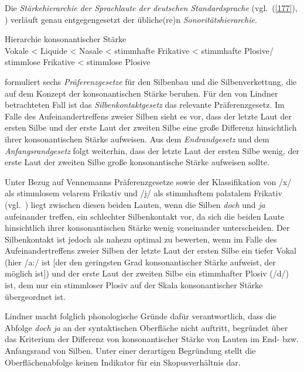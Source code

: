 Die \textit{Stärkehierarchie der Sprachlaute der deutschen Standardsprache} (vgl.\ (\ref{177}), \citealt[284]{Vennemann1982}) verläuft genau entgegengesetzt der übliche(re)n  \textit{Sonori\-tätshierarchie}.

\begin{exe}
	\ex\label{177} 
	Hierarchie konsonantischer Stärke \\
	Vokale < Liquide < Nasale < stimmhafte Frikative < stimmhafte Plosive/ \\ stimmlose Frikative < stimmlose Plosive
\end{exe}
\citet[283]{Vennemann1982} formuliert sechs \textit{Präferenzgesetze} für den Silbenbau und die Silbenverkettung, die auf dem Konzept der konsonantischen Stärke beruhen. Für den von Lindner betrachteten Fall ist das \textit{Silbenkontaktgesetz} das relevante Präferenzgesetz. Im Falle des Aufeinandertreffens zweier Silben sieht es vor, dass der letzte Laut der ersten Silbe und der erste Laut der zweiten Silbe eine große Differenz hinsichtlich ihrer konsonantischen Stärke aufweisen. Aus dem \textit{Endrandgesetz} und dem \textit{Anfangsrandgesetz} folgt weiterhin, dass der letzte Laut der ersten Silbe wenig, der erste Laut der zweiten Silbe große konsonantische Stärke aufweisen sollte. 

Unter Bezug auf Vennemanns Präferenzgesetze sowie der Klassifikation von /x/ als stimmlosem velarem Frikativ und /j/ als stimmhaftem palatalem Frikativ (vgl.\ \citealt[284]{Vennemann1982}) liegt zwischen diesen beiden Lauten, wenn die Silben \textit{doch} und \textit{ja} aufeinander treffen, ein schlechter Silbenkontakt vor, da sich die beiden Laute hinsichtlich ihrer konsonantischen Stärke wenig voneinander unterscheiden. Der Silbenkontakt ist jedoch als nahezu optimal zu bewerten, wenn im Falle des Aufeinandertreffens zweier Silben der letzte Laut der ersten Silbe ein tiefer Vokal (hier /a:/ ist [der den geringsten Grad konsonantischer Stärke aufweist, der möglich ist]) und der erste Laut der zweiten Silbe ein stimmhafter Plosiv (/d/) ist, dem nur ein stimmloser Plosiv auf der Skala konsonantischer Stärke übergeordnet ist. 

Lindner macht folglich phonologische Gründe dafür verantwortlich, dass die Abfolge \textit{doch ja} an der syntaktischen Oberfläche nicht auftritt, begründet über das Kriterium der Differenz von konsonantischer Stärke von Lauten im End- bzw. Anfangsrand von Silben. Unter einer derartigen Begründung stellt die Oberflächenabfolge keinen Indikator für ein Skopusverhältnis  dar. 


